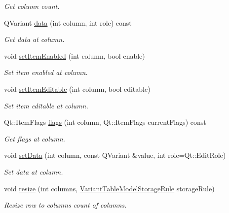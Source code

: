 \begin{DoxyCompactItemize}
\begin{DoxyCompactList}\small\item\em Get column count. \end{DoxyCompactList}\item 
Q\+Variant \hyperlink{class_mdt_1_1_item_model_1_1_variant_table_model_row_a02e05fe2be00e196694f29448938c89b}{data} (int column, int role) const 
\begin{DoxyCompactList}\small\item\em Get data at column. \end{DoxyCompactList}\item 
void \hyperlink{class_mdt_1_1_item_model_1_1_variant_table_model_row_aef7c9adec9dec2a7504f8e35fa7be4c8}{set\+Item\+Enabled} (int column, bool enable)
\begin{DoxyCompactList}\small\item\em Set item enabled at column. \end{DoxyCompactList}\item 
void \hyperlink{class_mdt_1_1_item_model_1_1_variant_table_model_row_a6f4939abd9d372df6f568a2d07ce97c5}{set\+Item\+Editable} (int column, bool editable)
\begin{DoxyCompactList}\small\item\em Set item editable at column. \end{DoxyCompactList}\item 
Qt\+::\+Item\+Flags \hyperlink{class_mdt_1_1_item_model_1_1_variant_table_model_row_a818c21a60b2df776f74aae0c44b71883}{flags} (int column, Qt\+::\+Item\+Flags current\+Flags) const 
\begin{DoxyCompactList}\small\item\em Get flags at column. \end{DoxyCompactList}\item 
void \hyperlink{class_mdt_1_1_item_model_1_1_variant_table_model_row_a4fe895e79697e13ee8f4d1c1f4968e5b}{set\+Data} (int column, const Q\+Variant \&value, int role=Qt\+::\+Edit\+Role)
\begin{DoxyCompactList}\small\item\em Set data at column. \end{DoxyCompactList}\item 
void \hyperlink{class_mdt_1_1_item_model_1_1_variant_table_model_row_a3d94b7a58e1e834427f365857bd42e16}{resize} (int columns, \hyperlink{namespace_mdt_1_1_item_model_ad48e47e80d7e13b5b951346649748190}{Variant\+Table\+Model\+Storage\+Rule} storage\+Rule)
\begin{DoxyCompactList}\small\item\em Resize row to columns count of columns. \end{DoxyCompactList}\item 

\end{DoxyCompactItemize}
